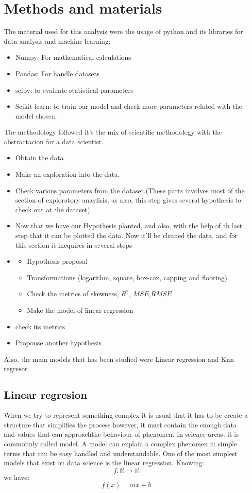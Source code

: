 \documentclass{article}
\begin{document}
\section{Methods and materials}
The material used for this analysis were the usage of python and its libraries for data analysis and machine learning:
\begin{itemize}
  \item Numpy: For mathematical calculations
  \item Pandas: For handle datasets 
  \item scipy: to evaluate statistical parameters
  \item Scikit-learn: to train our model and check more parameters related with the model chosen.  
\end{itemize}
The methodology followed it's the mix of scientific methodology with the abstractacion for a data scientist. 
\begin{itemize}
  \item Obtain the data
  \item Make an exploration into the data.
  \item Check various parameters from the dataset.(These parts involves most of the section of exploratory anaylisis, as also, this step gives several hypothesis to check out at the dataset)
  \item Now that we have our Hypothesis planted, and also, with the help of th last step that it can be plotted the data. Now it'll be cleaned the data, and for this section it incquires in several steps
  \item \begin{itemize}
    \item Hypothesis proposal
    \item Transformations (logarithm, square, box-cox, capping and flooring)
    \item Check the metrics of skewness, $R^2$, $MSE$,$RMSE$ 
    \item Make the model of linear regression 
  \end{itemize}
  \item check its metrics
  \item Propouse another hypothesis.
\end{itemize}
Also, the main models that has been studied were Linear regression and Knn regresor
\subsection{Linear regresion}
When we try to represent something complex it is usual that it has to be create a structure that simplifies the process however, it must contain the enough data and values that can approachthe behaviour of phenomen. In science areas, it is commonnly called model.
A model can explain a complex phenomen in simple terms that can be easy handled and understandable.
One of the most simplest models that exist on data science is the linear regression. 
Knowing:
$$f:\mathbb{R} \rightarrow \mathbb{R} $$
we have:
$$f(x)=mx+b$$
\end{document}

